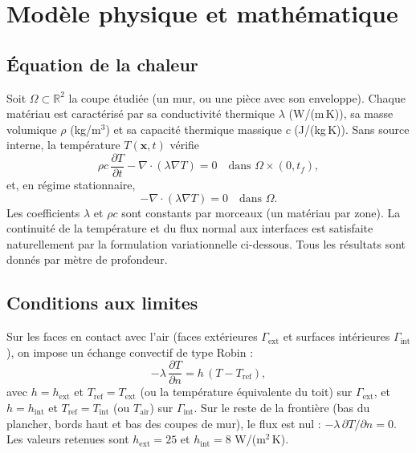 \section{Modèle physique et mathématique}

\subsection{Équation de la chaleur}
Soit $\Omega\subset\mathbb{R}^2$ la coupe étudiée (un mur, ou une pièce avec son enveloppe). Chaque matériau
est caractérisé par sa conductivité thermique $\lambda$ (W/(m\,K)), sa masse volumique $\rho$ (kg/m$^3$)
et sa capacité thermique massique $c$ (J/(kg\,K)). Sans source interne, la température $T(\mathbf{x},t)$
vérifie
\begin{equation}\label{eq:chaleur}
\rho c\,\frac{\partial T}{\partial t}-\nabla\!\cdot(\lambda\nabla T)=0
\quad\text{dans }\Omega\times(0,t_f),
\end{equation}
et, en régime stationnaire,
\begin{equation}\label{eq:stationnaire}
-\nabla\!\cdot(\lambda\nabla T)=0\quad\text{dans }\Omega.
\end{equation}
Les coefficients $\lambda$ et $\rho c$ sont constants par morceaux (un matériau par zone). La continuité de
la température et du flux normal aux interfaces est satisfaite naturellement par la formulation
variationnelle ci-dessous. Tous les résultats sont donnés par mètre de profondeur.

\subsection{Conditions aux limites}
Sur les faces en contact avec l'air (faces extérieures $\Gamma_{\mathrm{ext}}$ et surfaces intérieures
$\Gamma_{\mathrm{int}}$), on impose un échange convectif de type Robin :
\begin{equation}\label{eq:robin}
-\lambda\,\frac{\partial T}{\partial n}=h\,(T-T_{\mathrm{ref}}),
\end{equation}
avec $h=h_{\mathrm{ext}}$ et $T_{\mathrm{ref}}=T_{\mathrm{ext}}$ (ou la température équivalente du toit)
sur $\Gamma_{\mathrm{ext}}$, et $h=h_{\mathrm{int}}$ et $T_{\mathrm{ref}}=T_{\mathrm{int}}$ (ou $T_{\mathrm{air}}$)
sur $\Gamma_{\mathrm{int}}$. Sur le reste de la frontière (bas du plancher, bords haut et bas des coupes de mur),
le flux est nul : $-\lambda\,\partial T/\partial n=0$. Les valeurs retenues sont
$h_{\mathrm{ext}}=25$ et $h_{\mathrm{int}}=8$ W/(m$^2$\,K).

